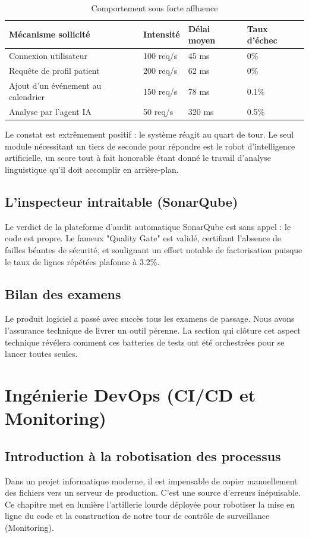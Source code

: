 \documentclass[final]{report}
\begin{document}
\begin{table}[H]
\centering
\caption{Comportement sous forte affluence}
\renewcommand{\arraystretch}{1.4}
\begin{tabularx}{\textwidth}{|X|p{2.2cm}|p{2cm}|p{2cm}|}
\hline
\textbf{Mécanisme sollicité} & \textbf{Intensité} & \textbf{Délai moyen} & \textbf{Taux d'échec} \\
\hline
Connexion utilisateur & 100 req/s & 45 ms & 0\% \\
\hline
Requête de profil patient & 200 req/s & 62 ms & 0\% \\
\hline
Ajout d'un événement au calendrier& 150 req/s & 78 ms & 0.1\% \\
\hline
Analyse par l'agent IA & 50 req/s & 320 ms & 0.5\% \\
\hline
\end{tabularx}
\end{table}
Le constat est extrêmement positif : le système réagit au quart de tour. Le seul module nécessitant un tiers de seconde pour répondre est le robot d'intelligence artificielle, un score tout à fait honorable étant donné le travail d'analyse linguistique qu'il doit accomplir en arrière-plan.
 
\section{L'inspecteur intraitable (SonarQube)}
Le verdict de la plateforme d'audit automatique SonarQube est sans appel : le code est propre. Le fameux "Quality Gate" est validé, certifiant l'absence de failles béantes de sécurité, et soulignant un effort notable de factorisation puisque le taux de lignes répétées plafonne à 3.2\%.
 
\section{Bilan des examens}
Le produit logiciel a passé avec succès tous les examens de passage. Nous avons l'assurance technique de livrer un outil pérenne. La section qui clôture cet aspect technique révélera comment ces batteries de tests ont été orchestrées pour se lancer toutes seules.
 

\chapter{Ingénierie DevOps (CI/CD et Monitoring)}
 
\section{Introduction à la robotisation des processus}
Dans un projet informatique moderne, il est impensable de copier manuellement des fichiers vers un serveur de production. C'est une source d'erreurs inépuisable. Ce chapitre met en lumière l'artillerie lourde déployée pour robotiser la mise en ligne du code et la construction de notre tour de contrôle de surveillance (Monitoring).
 
\end{document}
